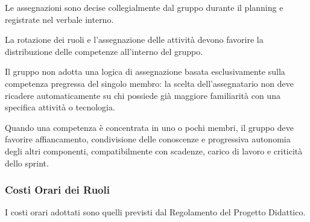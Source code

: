 Le assegnazioni sono decise collegialmente dal gruppo durante il planning e
registrate nel verbale interno.

La rotazione dei ruoli e l'assegnazione delle attività devono favorire la
distribuzione delle competenze all'interno del gruppo.

Il gruppo non adotta una logica di assegnazione basata esclusivamente sulla
competenza pregressa del singolo membro: la scelta dell'assegnatario non deve
ricadere automaticamente su chi possiede già maggiore familiarità con una
specifica attività o tecnologia.

Quando una competenza è concentrata in uno o pochi membri, il gruppo deve
favorire affiancamento, condivisione delle conoscenze e progressiva autonomia
degli altri componenti, compatibilmente con scadenze, carico di lavoro e criticità
dello sprint.


\subsubsection{Costi Orari dei Ruoli}

I costi orari adottati sono quelli previsti dal Regolamento del Progetto Didattico.

